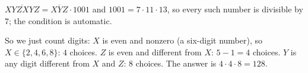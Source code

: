 $\overline{XYZXYZ}=\overline{XYZ}\cdot1001$ and $1001=7\cdot11\cdot13$, so every such number is divisible by $7$; the condition is automatic.

So we just count digits: $X$ is even and nonzero (a six-digit number), so $X\in\{2,4,6,8\}$: $4$ choices. $Z$ is even and different from $X$: $5-1=4$ choices. $Y$ is any digit different from $X$ and $Z$: $8$ choices. The answer is $4\cdot4\cdot8=\boxed{128}$.

